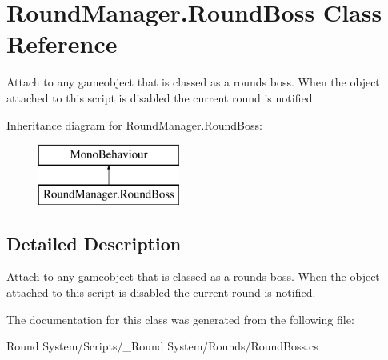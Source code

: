 \hypertarget{class_round_manager_1_1_round_boss}{}\section{Round\+Manager.\+Round\+Boss Class Reference}
\label{class_round_manager_1_1_round_boss}


Attach to any gameobject that is classed as a rounds boss. When the object attached to this script is disabled the current round is notified.  


Inheritance diagram for Round\+Manager.\+Round\+Boss\+:\begin{figure}[H]
\begin{center}
\leavevmode
\includegraphics[height=2.000000cm]{class_round_manager_1_1_round_boss}
\end{center}
\end{figure}


\subsection{Detailed Description}
Attach to any gameobject that is classed as a rounds boss. When the object attached to this script is disabled the current round is notified. 



The documentation for this class was generated from the following file\+:\begin{DoxyCompactItemize}
\item 
Round System/\+Scripts/\+\_\+\+Round System/\+Rounds/Round\+Boss.\+cs\end{DoxyCompactItemize}
